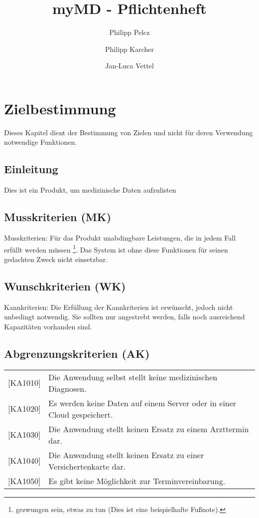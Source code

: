 \documentclass[a4paper]{scrreprt}
\begin{document}
 
\begin{titlepage}

\title{myMD - Pflichtenheft}
\author{Philipp Pelcz \and Philipp Karcher \and Jan-Luca Vettel}

\end{titlepage} 

\maketitle
 

\tableofcontents
 
\chapter{Zielbestimmung}
Dieses Kapitel dient der Bestimmung von Zielen und nicht für deren Verwendung
notwendige Funktionen.

\section{Einleitung}
Dies ist ein Produkt, um medizinische Daten aufzulisten
 
\section{Musskriterien (MK)}
Musskriterien: Für das Produkt unabdingbare Leistungen, die in jedem Fall
erfüllt werden müssen \footnote{gezwungen sein, etwas zu tun (Dies ist eine
beispielhafte Fußnote).}. Das System ist ohne diese Funktionen für seinen
gedachten Zweck nicht einsetzbar.
 
\section{Wunschkriterien (WK)}
Kannkriterien: Die Erfüllung der Kannkriterien ist erwünscht, jedoch nicht
unbedingt notwendig. Sie sollten nur angestrebt werden, falls noch ausreichend
Kapazitäten vorhanden sind.
 
\section{Abgrenzungskriterien (AK)}
\begin{tabular}{ll}
[KA1010] &  Die Anwendung selbst stellt keine medizinischen Diagnosen. \\
{[KA1020]} &  Es werden keine Daten auf einem Server oder in einer Cloud gespeichert. \\
{[KA1030]} &  Die Anwendung stellt keinen Ersatz zu einem Arzttermin dar. \\
{[KA1040]} &  Die Anwendung stellt keinen Ersatz zu einer Versichertenkarte dar. \\
{[KA1050]} &  Es gibt keine Möglichkeit zur Terminvereinbarung. \\
\end{tabular}
 
\end{document}
